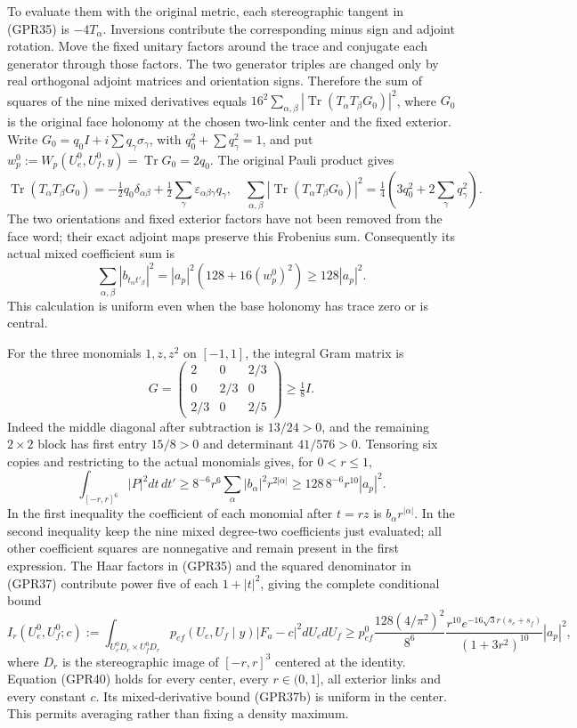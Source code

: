 \documentclass[11pt]{article}
\begin{document}
To evaluate them with the original metric, each stereographic tangent in (GPR35) is \(-4T_\alpha\). Inversions contribute the corresponding minus sign and adjoint rotation. Move the fixed unitary factors around the trace and conjugate each generator through those factors. The two generator triples are changed only by real orthogonal adjoint matrices and orientation signs. Therefore the sum of squares of the nine mixed derivatives equals \(16^2\sum_{\alpha,\beta}|\operatorname{Tr}(T_\alpha T_\beta G_0)|^2\), where \(G_0\) is the original face holonomy at the chosen two-link center and the fixed exterior. Write \(G_0=q_0I+i\sum q_\gamma\sigma_\gamma\), with \(q_0^2+\sum q_\gamma^2=1\), and put \(w_p^0:=W_p(U_e^0,U_f^0,y)=\operatorname{Tr}G_0=2q_0\). The original Pauli product gives
\[
 \operatorname{Tr}(T_\alpha T_\beta G_0)
 =-\tfrac12q_0\delta_{\alpha\beta}
   +\tfrac12\sum_\gamma\varepsilon_{\alpha\beta\gamma}q_\gamma,
 \quad
 \sum_{\alpha,\beta}|\operatorname{Tr}(T_\alpha T_\beta G_0)|^2
 =\tfrac14(3q_0^2+2\sum_\gamma q_\gamma^2).
 \tag{GPR37a}
\]
The two orientations and fixed exterior factors have not been removed from the face word; their exact adjoint maps preserve this Frobenius sum. Consequently its actual mixed coefficient sum is
\[
 \sum_{\alpha,\beta}|b_{t_\alpha t'_\beta}|^2
 =|a_p|^2(128+16(w_p^0)^2)\ge128|a_p|^2.
 \tag{GPR37b}
\]
This calculation is uniform even when the base holonomy has trace zero or is central.

For the three monomials \(1,z,z^2\) on \([-1,1]\), the integral Gram matrix is
\[
 G=\begin{pmatrix}2&0&2/3\\0&2/3&0\\2/3&0&2/5\end{pmatrix}\ge\tfrac18I.
 \tag{GPR38}
\]
Indeed the middle diagonal after subtraction is \(13/24>0\), and the remaining \(2\times2\) block has first entry \(15/8>0\) and determinant \(41/576>0\). Tensoring six copies and restricting to the actual monomials gives, for \(0<r\le1\),
\[
 \int_{[-r,r]^6}|P|^2dt\,dt'
 \ge8^{-6}r^6\sum_\alpha|b_\alpha|^2r^{2|\alpha|}
 \ge128\,8^{-6}r^{10}|a_p|^2.
 \tag{GPR39}
\]
In the first inequality the coefficient of each monomial after \(t=rz\) is \(b_\alpha r^{|\alpha|}\). In the second inequality keep the nine mixed degree-two coefficients just evaluated; all other coefficient squares are nonnegative and remain present in the first expression. The Haar factors in (GPR35) and the squared denominator in (GPR37) contribute power five of each \(1+|t|^2\), giving the complete conditional bound
\[
 I_r(U_e^0,U_f^0;c):=
 \int_{U_e^0D_r\times U_f^0D_r}p_{ef}(U_e,U_f\mid y)|F_a-c|^2dU_edU_f
 \ge p_{ef}^0\frac{128(4/\pi^2)^2}{8^6}
       \frac{r^{10}e^{-16\sqrt3r(s_e+s_f)}}{(1+3r^2)^{10}}|a_p|^2,
 \tag{GPR40}
\]
where \(D_r\) is the stereographic image of \([-r,r]^3\) centered at the identity. Equation (GPR40) holds for every center, every \(r\in(0,1]\), all exterior links and every constant \(c\). Its mixed-derivative bound (GPR37b) is uniform in the center. This permits averaging rather than fixing a density maximum.
\end{document}
